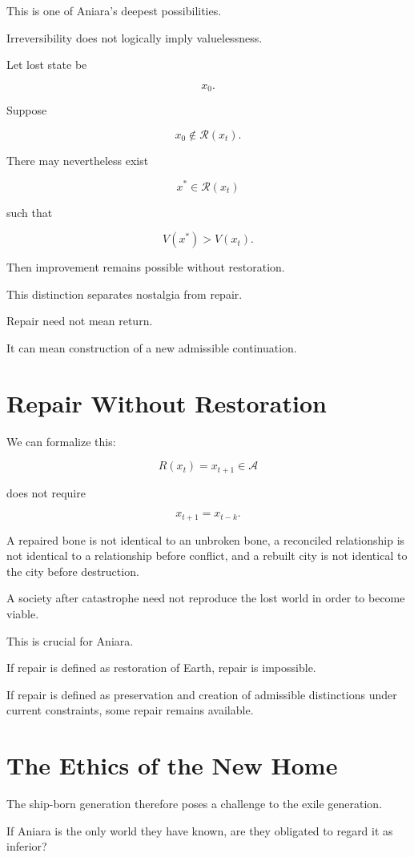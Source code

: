 \documentclass[11pt,oneside]{book}
\theoremstyle{definition}
\theoremstyle{remark}
\newcommand{\A}{\mathcal{A}}
\newcommand{\R}{\mathcal{R}}
\begin{document}
This is one of Aniara's deepest possibilities.

Irreversibility does not logically imply valuelessness.

Let lost state be

\[
x_0.
\]

Suppose

\[
x_0\notin\R(x_t).
\]

There may nevertheless exist

\[
x^\ast\in\R(x_t)
\]

such that

\[
V(x^\ast)>V(x_t).
\]

Then improvement remains possible without restoration.

This distinction separates nostalgia from repair.

Repair need not mean return.

It can mean construction of a new admissible continuation.

\section{Repair Without Restoration}

We can formalize this:

\[
R(x_t)
=
x_{t+1}\in\A
\]

does not require

\[
x_{t+1}=x_{t-k}.
\]

A repaired bone is not identical to an unbroken bone, a reconciled relationship is not identical to a relationship before conflict, and a rebuilt city is not identical to the city before destruction.

A society after catastrophe need not reproduce the lost world in order to become viable.

This is crucial for Aniara.

If repair is defined as restoration of Earth, repair is impossible.

If repair is defined as preservation and creation of admissible distinctions under current constraints, some repair remains available.

\section{The Ethics of the New Home}

The ship-born generation therefore poses a challenge to the exile generation.

If Aniara is the only world they have known, are they obligated to regard it as inferior?
\end{document}
